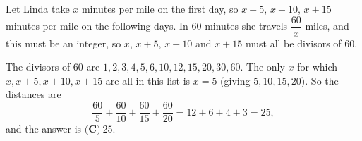 Let Linda take $x$ minutes per mile on the first day, so $x+5$, $x+10$, $x+15$ minutes per mile on the following days. In $60$ minutes she travels $\dfrac{60}{x}$ miles, and this must be an integer, so $x$, $x+5$, $x+10$ and $x+15$ must all be divisors of $60$.

The divisors of $60$ are $1,2,3,4,5,6,10,12,15,20,30,60$. The only $x$ for which $x,x+5,x+10,x+15$ are all in this list is $x=5$ (giving $5,10,15,20$). So the distances are
\[\dfrac{60}{5}+\dfrac{60}{10}+\dfrac{60}{15}+\dfrac{60}{20}=12+6+4+3=25,\]
and the answer is $\boxed{\textbf{(C)}\ 25}$.

